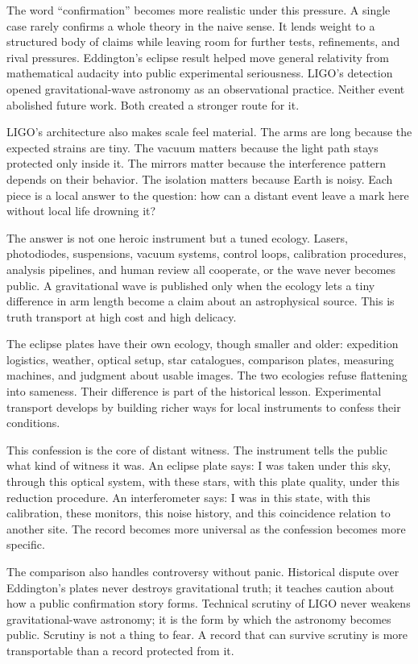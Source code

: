 The word ``confirmation'' becomes more realistic under this pressure. A
single case rarely confirms a whole theory in the naive sense. It lends
weight to a structured body of claims while leaving room for further
tests, refinements, and rival pressures. Eddington's eclipse result
helped move general relativity from mathematical audacity into public
experimental seriousness. LIGO's detection opened gravitational-wave
astronomy as an observational practice. Neither event abolished future
work. Both created a stronger route for it.

LIGO's architecture also makes scale feel material. The arms are long
because the expected strains are tiny. The vacuum matters because the
light path stays protected only inside it. The mirrors matter because the
interference pattern depends on their behavior. The isolation matters
because Earth is noisy. Each piece is a local answer to the question:
how can a distant event leave a mark here without local life drowning
it?

The answer is not one heroic instrument but a tuned ecology. Lasers,
photodiodes, suspensions, vacuum systems, control loops, calibration
procedures, analysis pipelines, and human review all cooperate, or the
wave never becomes public. A gravitational wave is published only when
the ecology lets a tiny difference in arm length become a claim about an
astrophysical source. This is truth transport at high cost and high
delicacy.

The eclipse plates have their own ecology, though smaller and older:
expedition logistics, weather, optical setup, star catalogues,
comparison plates, measuring machines, and judgment about usable images.
The two ecologies refuse flattening into sameness. Their difference is
part of the historical lesson. Experimental transport develops by
building richer ways for local instruments to confess their conditions.

This confession is the core of distant witness. The instrument tells the
public what kind of witness it was. An eclipse plate says: I was taken
under this sky, through this optical system, with these stars, with this
plate quality, under this reduction procedure. An interferometer says: I
was in this state, with this calibration, these monitors, this noise
history, and this coincidence relation to another site. The record
becomes more universal as the confession becomes more specific.

The comparison also handles controversy without panic. Historical
dispute over Eddington's plates never destroys gravitational truth; it
teaches caution about how a public confirmation story forms. Technical
scrutiny of LIGO never weakens gravitational-wave astronomy; it is the
form by which the astronomy becomes public. Scrutiny is not a thing to
fear. A record that can survive scrutiny is more transportable than a
record protected from it.

